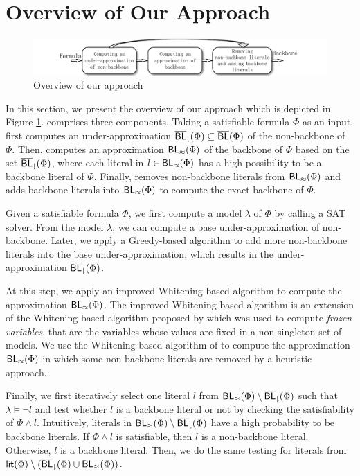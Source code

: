 \section{Overview of Our Approach}\label{sec:walg}
\begin{figure} 
\centering
    \includegraphics[scale=0.9]{Framework}
   \caption{Overview of our approach}
   \label{flow}
\end{figure}

In this section, we present the overview of our approach \tool which is depicted in Figure
\ref{flow}. \tool comprises three components. Taking a satisfiable formula
$\Phi$ as an input, \tool first computes an under-approximation ${\sf \overline{BL}_\downharpoonright}(\Phi)\subseteq \overline{\textsf{BL}}(\Phi)$ of the non-backbone of  
$\Phi$. Then, \tool computes an approximation ${\sf BL_\approx}(\Phi)$ of the backbone of $\Phi$ based on the set ${\sf \overline{BL}_\downharpoonright}(\Phi)$, where each literal in $l\in {\sf BL_\approx}(\Phi)$ has a high possibility to be a backbone literal of $\Phi$.
Finally, \tool removes non-backbone literals from ${\sf BL_\approx}(\Phi)$ and adds backbone literals into ${\sf BL_\approx}(\Phi)$ to compute the exact backbone of $\Phi$.

\medskip
{}
Given a satisfiable formula $\Phi$, we first compute a model $\lambda$ of $\Phi$ by calling a SAT solver.
From the model $\lambda$, we can compute a base under-approximation of non-backbone.
Later, we apply a Greedy-based algorithm to add more non-backbone literals into the base under-approximation, which results in the
under-approximation ${\sf \overline{BL}_\downharpoonright}(\Phi)$.
 


\medskip
{}
At this step, we apply an improved Whitening-based algorithm to compute the approximation ${\sf BL_\approx}(\Phi)$.
The improved Whitening-based algorithm is an extension of the Whitening-based algorithm proposed by \cite{LMZ09} which 
was used to compute \emph{frozen variables}, that are the variables whose values are fixed in a non-singleton set of models.
We use the Whitening-based algorithm of \cite{LMZ09} to compute the approximation ${\sf BL_\approx}(\Phi)$ in which some non-backbone literals are removed by 
a heuristic approach.


\medskip
{}
Finally, we first iteratively select one literal $l$ from ${\sf BL_\approx}(\Phi)\setminus {\sf \overline{BL}_\downharpoonright}(\Phi)$ such that $\lambda \models \neg l$ and test whether
$l$ is a backbone literal or not by checking the satisfiability of $\Phi\wedge l$. Intuitively, literals in ${\sf BL_\approx}(\Phi)\setminus {\sf \overline{BL}_\downharpoonright}(\Phi)$ have a high probability to be backbone literals.
If $\Phi\wedge l$ is satisfiable, then $l$ is a non-backbone literal. 
Otherwise, $l$ is a backbone literal. Then, we do the same testing for literals from $\textsf{lit}(\Phi)\setminus ({\sf \overline{BL}_\downharpoonright}(\Phi)\cup{\sf BL_\approx}(\Phi))$.




